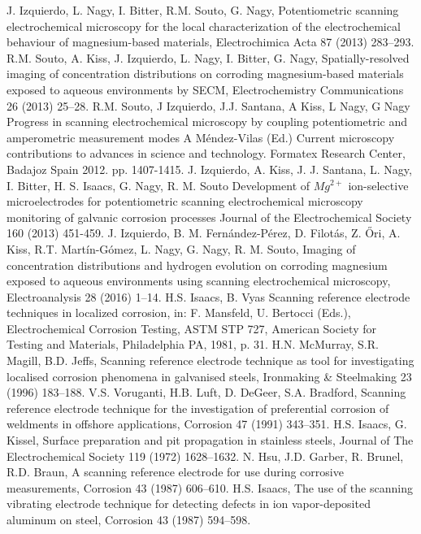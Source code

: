 \documentclass[3p]{elsarticle}
\begin{document}
\begin{thebibliography}{5}
J. Izquierdo, L. Nagy, I. Bitter, R.M. Souto, G. Nagy, 
Potentiometric scanning electrochemical microscopy for the local characterization of the electrochemical behaviour of magnesium-based materials, Electrochimica Acta 87 (2013) 283–293.
R.M. Souto, A. Kiss, J. Izquierdo, L. Nagy, I. Bitter, G. Nagy, Spatially-resolved imaging of concentration distributions on corroding magnesium-based materials exposed to aqueous environments by SECM, Electrochemistry Communications 26 (2013) 25–28.
R.M. Souto, J Izquierdo, J.J. Santana, A Kiss, L Nagy, G Nagy 
Progress in scanning electrochemical microscopy by coupling potentiometric and amperometric measurement modes
A Méndez-Vilas (Ed.)
Current microscopy contributions to advances in science and technology. Formatex Research Center, Badajoz Spain 2012. pp. 1407-1415.
J. Izquierdo, A. Kiss, J. J. Santana, L. Nagy, I. Bitter, H. S. Isaacs, G. Nagy, R. M. Souto
Development of $Mg^{2+}$ ion-selective microelectrodes for potentiometric scanning electrochemical microscopy monitoring of galvanic corrosion processes
Journal of the Electrochemical Society  160 (2013) 451-459. 
J. Izquierdo, B. M. Fernández-Pérez, D. Filotás, Z. Őri, A. Kiss, R.T. Martín-Gómez, L. Nagy, G. Nagy, R. M. Souto, Imaging of concentration distributions and hydrogen evolution on corroding magnesium exposed to aqueous environments using scanning electrochemical microscopy, Electroanalysis 28 (2016) 1–14.
H.S. Isaacs, B. Vyas Scanning reference electrode techniques in localized corrosion, in: F. Mansfeld, U. Bertocci (Eds.), Electrochemical Corrosion Testing, ASTM STP 727, American Society for Testing and Materials, Philadelphia PA, 1981, p. 31.
H.N. McMurray, S.R. Magill, B.D. Jeffs, Scanning reference electrode technique as tool for investigating localised corrosion phenomena in galvanised steels, Ironmaking \& Steelmaking 23 (1996) 183–188.
V.S. Voruganti, H.B. Luft, D. DeGeer, S.A. Bradford, Scanning reference electrode technique for the investigation of preferential corrosion of weldments in offshore applications, Corrosion 47 (1991) 343–351.
H.S. Isaacs, G. Kissel, Surface preparation and pit propagation in stainless steels, Journal of The Electrochemical Society 119 (1972) 1628–1632.
N. Hsu, J.D. Garber, R. Brunel, R.D. Braun, A scanning reference electrode for use during corrosive measurements, Corrosion 43 (1987) 606–610.
H.S. Isaacs, The use of the scanning vibrating electrode technique for detecting defects in ion vapor-deposited aluminum on steel, Corrosion 43 (1987) 594–598.   


\end{thebibliography}
\end{document}

